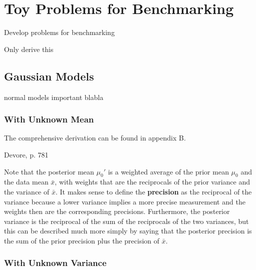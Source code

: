 








\section{Toy Problems for Benchmarking}\label{sec:toy_problems}

Develop problems for benchmarking



Only derive this

\subsection{Gaussian Models}\label{sec:gaussian_models}

normal models important blabla

\subsubsection{With Unknown Mean}

The comprehensive derivation can be found in appendix B. 

Devore, p. 781 

Note that the posterior mean $\mu_0'$ is a weighted average of the prior mean $\mu_0$ and the data mean $\bar{x}$, with weights that are the reciprocals of the prior variance and the variance of $\bar{x}$. It makes sense to define the \textbf{precision} as the reciprocal of the variance because a lower variance implies a more precise measurement and the weights then are the corresponding precisions. Furthermore, the posterior variance is the reciprocal of the sum of the reciprocals of the two variances, but this can be described much more simply by saying that the posterior precision is the sum of the prior precision plus the precision of $\bar{x}$. 

\subsubsection{With Unknown Variance}

